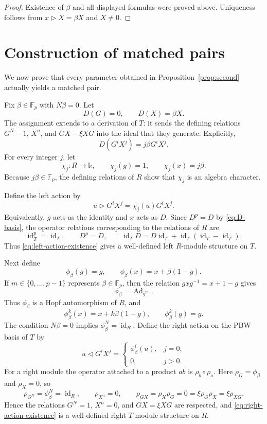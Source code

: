 \documentclass[twoside,11pt]{amsart}
\newcommand{\K}{\mathds{k}}
\newcommand{\F}{\mathbb{F}}
\newcommand{\id}{\operatorname{id}}
\begin{document}
	\begin{proof}
		Existence of $\beta$ and all displayed formulas were proved above. Uniqueness
		follows from $x\triangleright X=\beta X$ and $X\ne0$.
	\end{proof}
	
	\section{Construction of matched pairs}\label{sec:exist}
	
	We now prove that every parameter obtained in Proposition~\ref{prop:second}
	actually yields a matched pair.
	
	Fix $\beta\in\F_p$ with $N\beta=0$. Let
	\[
	D(G)=0,
	\qquad
	D(X)=\beta X.
	\]
	The assignment extends to a derivation of $T$: it sends the defining
	relations $G^N-1$, $X^n$, and $GX-\xi XG$ into the ideal that they generate.
	Explicitly,
	\begin{equation}\label{eq:D-basis}
		D(G^iX^j)=j\beta G^iX^j.
	\end{equation}
	For every integer $j$, let
	\begin{equation}\label{eq:chi-j}
		\chi_j:R\to\K,
		\qquad
		\chi_j(g)=1,
		\qquad
		\chi_j(x)=j\beta.
	\end{equation}
	Because $j\beta\in\F_p$, the defining relations of $R$ show that $\chi_j$ is
	an algebra character.
	
	Define the left action by
	\begin{equation}\label{eq:left-action-existence}
		u\triangleright G^iX^j
		=\chi_j(u)G^iX^j.
	\end{equation}
	Equivalently, $g$ acts as the identity and $x$ acts as $D$. Since
	$D^p=D$ by \eqref{eq:D-basis}, the operator relations corresponding to the
	relations of $R$ are
	\[
	\id_T^p=\id_T,
	\qquad D^p=D,
	\qquad \id_TD=D\id_T+\id_T(\id_T-\id_T).
	\]
	Thus \eqref{eq:left-action-existence} gives a well-defined left
	$R$-module structure on $T$.
	
	Next define
	\[
	\phi_\beta(g)=g,
	\qquad
	\phi_\beta(x)=x+\beta(1-g).
	\]
	If $m\in\{0,\dots,p-1\}$ represents $\beta\in\F_p$, then the relation
	$gxg^{-1}=x+1-g$ gives
	\[
	\phi_\beta=\operatorname{Ad}_{g^m}.
	\]
	Thus $\phi_\beta$ is a Hopf automorphism of $R$, and
	\[
	\phi_\beta^k(x)=x+k\beta(1-g),
	\qquad
	\phi_\beta^k(g)=g.
	\]
	The condition $N\beta=0$ implies $\phi_\beta^N=\id_R$. Define the right
	action on the PBW basis of $T$ by
	\begin{equation}\label{eq:right-action-existence}
		u\triangleleft G^iX^j=
		\begin{cases}
			\phi_\beta^i(u),&j=0,\\
			0,&j>0.
		\end{cases}
	\end{equation}
	For a right module the operator attached to a product $ab$ is
	$\rho_b\circ\rho_a$. Here $\rho_G=\phi_\beta$ and $\rho_X=0$, so
	\[
	\rho_{G^N}=\phi_\beta^N=\id_R,
	\qquad \rho_{X^n}=0,
	\qquad \rho_{GX}=\rho_X\rho_G=0
	=\xi\rho_G\rho_X=\xi\rho_{XG}.
	\]
	Hence the relations $G^N=1$, $X^n=0$, and $GX=\xi XG$ are respected, and
	\eqref{eq:right-action-existence} is a well-defined right $T$-module
	structure on $R$.
	
\end{document}
